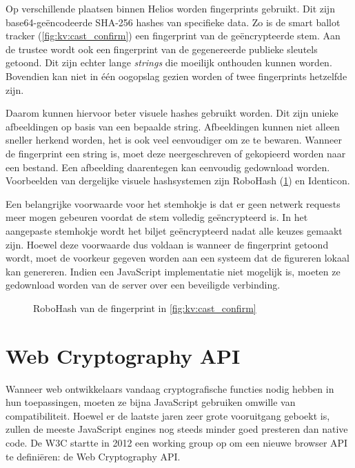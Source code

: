 Op verschillende plaatsen binnen Helios worden fingerprints gebruikt. Dit zijn base64-ge\"encodeerde SHA-256 hashes van specifieke data.\cite{fips_180_4} Zo is de smart ballot tracker (\ref{fig:kv:cast_confirm}) een fingerprint van de ge\"encrypteerde stem. Aan de trustee wordt ook een fingerprint van de gegenereerde publieke sleutels getoond. Dit zijn echter lange \textit{strings} die moeilijk onthouden kunnen worden. Bovendien kan niet in \'e\'en oogopslag gezien worden of twee fingerprints hetzelfde zijn.

\npar Daarom kunnen hiervoor beter visuele hashes gebruikt worden. Dit zijn unieke afbeeldingen op basis van een bepaalde string. Afbeeldingen kunnen niet alleen sneller herkend worden, het is ook veel eenvoudiger om ze te bewaren. Wanneer de fingerprint een string is, moet deze neergeschreven of gekopieerd worden naar een bestand. Een afbeelding daarentegen kan eenvoudig gedownload worden. Voorbeelden van dergelijke visuele hashsystemen zijn RoboHash (\ref{fig:sf:robohash}) en Identicon.\cite{site:robohash}\cite{wiki:identicon}

\npar Een belangrijke voorwaarde voor het stemhokje is dat er geen netwerk requests meer mogen gebeuren voordat de stem volledig ge\"encrypteerd is.\cite{adida_helios} In het aangepaste stemhokje wordt het biljet ge\"encrypteerd nadat alle keuzes gemaakt zijn. Hoewel deze voorwaarde dus voldaan is wanneer de fingerprint getoond wordt, moet de voorkeur gegeven worden aan een systeem dat de figureren lokaal kan genereren. Indien een JavaScript implementatie niet mogelijk is, moeten ze gedownload worden van de server over een beveiligde verbinding.

\begin{figure}
  \caption{RoboHash van de fingerprint in \ref{fig:kv:cast_confirm}}
  \label{fig:sf:robohash}
\end{figure}

\section{Web Cryptography API}
\label{chap:web_cryptography_api}

Wanneer web ontwikkelaars vandaag cryptografische functies nodig hebben in hun toepassingen, moeten ze bijna JavaScript gebruiken omwille van compatibiliteit. Hoewel er de laatste jaren zeer grote vooruitgang geboekt is, zullen de meeste JavaScript engines nog steeds minder goed presteren dan native code.\cite{site:resig_javascript_performance_rundown}\cite{site:cois_javascript_performance_rundown_2012}\cite{smedberg_performance_analysis_of_javascript} De W3C startte in 2012 een working group op om een nieuwe browser API te defini\"eren: de Web Cryptography API.\cite{wiki:webcrypto}

